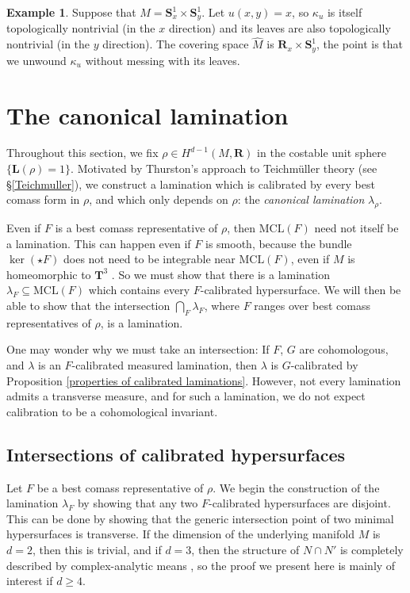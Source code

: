 \documentclass[reqno,11pt]{amsart}
\newcommand{\RR}{\mathbf{R}}
\newcommand{\Sph}{\mathbf S}
\newcommand{\MCL}{\mathrm{MCL}}
\newcommand{\Comass}{\mathbf L}
\newcommand{\dfn}[1]{\emph{#1}\index{#1}}
\theoremstyle{definition}
\newtheorem{example}[theorem]{Example}
\numberwithin{equation}{section}
\begin{document}
\begin{example}
Suppose that $M = \Sph^1_x \times \Sph^1_y$.
Let $u(x, y) = x$, so $\kappa_u$ is itself topologically nontrivial (in the $x$ direction) and its leaves are also topologically nontrivial (in the $y$ direction).
The covering space $\hat M$ is $\RR_x \times \Sph_y^1$, the point is that we unwound $\kappa_u$ without messing with its leaves.
\end{example}

\section{The canonical lamination}
\label{canonical sec}
Throughout this section, we fix $\rho \in H^{d - 1}(M, \RR)$ in the costable unit sphere $\{\Comass(\rho) = 1\}$.
Motivated by Thurston's approach to Teichm\"uller theory (see \S\ref{Teichmuller}), we construct a lamination which is calibrated by every best comass form in $\rho$, and which only depends on $\rho$: the \dfn{canonical lamination} $\lambda_\rho$.

Even if $F$ is a best comass representative of $\rho$, then $\MCL(F)$ need not itself be a lamination.
This can happen even if $F$ is smooth, because the bundle $\ker(\star F)$ does not need to be integrable near $\MCL(F)$, even if $M$ is homeomorphic to $\mathbf T^3$ \cite[Example 5.4]{bangert_cui_2017}.
So we must show that there is a lamination $\lambda_F \subseteq \MCL(F)$ which contains every $F$-calibrated hypersurface.
We will then be able to show that the intersection $\bigcap_F \lambda_F$, where $F$ ranges over best comass representatives of $\rho$, is a lamination.

One may wonder why we must take an intersection:
If $F$, $G$ are cohomologous, and $\lambda$ is an $F$-calibrated measured lamination, then $\lambda$ is $G$-calibrated by Proposition \ref{properties of calibrated laminations}.
However, not every lamination admits a transverse measure, and for such a lamination, we do not expect calibration to be a cohomological invariant.


\subsection{Intersections of calibrated hypersurfaces}\label{nodal appendix}
Let $F$ be a best comass representative of $\rho$.
We begin the construction of the lamination $\lambda_F$ by showing that any two $F$-calibrated hypersurfaces are disjoint.
This can be done by showing that the generic intersection point of two minimal hypersurfaces is transverse.
If the dimension of the underlying manifold $M$ is $d = 2$, then this is trivial, and if $d = 3$, then the structure of $N \cap N'$ is completely described by complex-analytic means \cite[Theorem 7.3]{colding2011course}, so the proof we present here is mainly of interest if $d \geq 4$.
\end{document}
